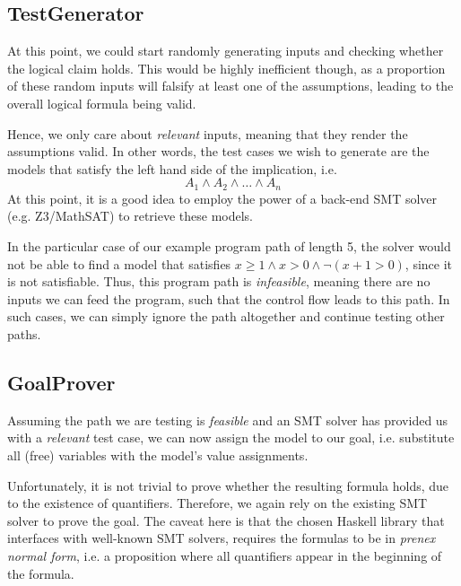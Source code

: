 \documentclass[nonatbib,numbers,10pt]{sigplanconf}
\begin{document}
\subsection{TestGenerator}
At this point, we could start randomly generating inputs and checking whether the logical claim holds.
This would be highly inefficient though, as a proportion of these random inputs will falsify at least one of the assumptions, leading to the overall logical formula being valid.

Hence, we only care about \textit{relevant} inputs, meaning that they render the assumptions valid. In other words, the test cases we wish to generate are the models that satisfy the left hand side of the implication, i.e.
\begin{equation*}
A_1 \land A_2 \land \dots \land A_n 
\end{equation*}
At this point, it is a good idea to employ the power of a back-end SMT solver (e.g. Z3/MathSAT) to retrieve these models.

In the particular case of our example program path of length 5, the solver would not be able to find a model that satisfies $ x \ge 1  \land x > 0 \land \neg (x + 1 > 0) $, since it is not satisfiable. Thus, this program path is \textit{infeasible}, meaning there are no inputs we can feed the program, such that the control flow leads to this path. In such cases, we can simply ignore the path altogether and continue testing other paths.

\subsection{GoalProver}
Assuming the path we are testing is \textit{feasible} and an SMT solver has provided us with a \textit{relevant} test case, we can now assign the model to our goal, i.e. substitute all (free) variables with the model's value assignments.

Unfortunately, it is not trivial to prove whether the resulting formula holds, due to the existence of quantifiers. Therefore, we again rely on the existing SMT solver to prove the goal. The caveat here is that the chosen Haskell library that interfaces with well-known SMT solvers, requires the formulas to be in \textit{prenex normal form}, i.e. a proposition where all quantifiers appear in the beginning of the formula.
\end{document}

